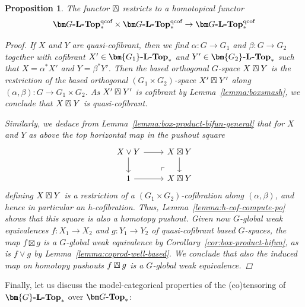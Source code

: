 \documentclass[reqno]{memo-l}
\theoremstyle{mythm}
\newtheorem{prop}[thm]{Proposition}
\theoremstyle{definition}
\numberwithin{equation}{section}
\newcommand{\boxsmash}{\mathbin{\raise.5pt\hbox{\rlap{\lower.5pt\hbox{$\square$}}\kern.55pt$\smashp$\kern.55pt}}}
\newcommand{\cat}[1]{\textbf{\textup{#1}}}
\let\smashp=\wedge
\begin{document}
\begin{prop}\label{prop:boxsmash-qcof}
    The functor $\boxsmash$ restricts to a homotopical functor
    \[
        \cat{$\bm G$-$\cat{L}$-Top}^\textup{qcof}_*
        \times
        \cat{$\bm G$-$\cat{L}$-Top}^\textup{qcof}_*\to
        \cat{$\bm G$-$\cat{L}$-Top}^\textup{qcof}_*
    \]
    \begin{proof}
        If $X$ and $Y$ are quasi-cofibrant, then we find $\alpha\colon G\to G_1$ and $\beta\colon G\to G_2$ together with cofibrant $X'\in\cat{$\bm{G_1}$-\cat{L}-Top}_*$ and $Y'\in\cat{$\bm{G_2}$-\cat{L}-Top}_*$ such that $X=\alpha^*X'$ and $Y=\beta^*Y'$. Then the based orthogonal $G$-space $X\boxsmash Y$ is the restriction of the based orthogonal $(G_1\times G_2)$-space $X'\boxsmash Y'$ along $(\alpha,\beta)\colon G\to G_1\times G_2$. As $X'\boxsmash Y'$ is cofibrant by Lemma~\ref{lemma:boxsmash}, we conclude that $X\boxsmash Y$ is quasi-cofibrant.

        Similarly, we deduce from Lemma~\ref{lemma:box-product-bifun-general} that for $X$ and $Y$ as above the top horizontal map in the pushout square
        \[
            \begin{tikzcd}
                X\vee Y\arrow[d]\arrow[r]\arrow[dr,"\ulcorner"{very near end},phantom] & X\boxtimes Y\arrow[d]\\
                1\arrow[r] & X\boxsmash Y
            \end{tikzcd}
        \]
        defining $X\boxsmash Y$ is a restriction of a $(G_1\times G_2)$-cofibration along $(\alpha,\beta)$, and hence in particular an h-cofibration. Thus, Lemma~\ref{lemma:h-cof-compute-po} shows that this square is also a homotopy pushout. Given now $G$-global weak equivalences $f\colon X_1\to X_2$ and $g\colon Y_1\to Y_2$ of quasi-cofibrant based $G$-spaces, the map $f\boxtimes g$ is a $G$-global weak equivalence by Corollary~\ref{cor:box-product-bifun}, as is $f\vee g$ by Lemma~\ref{lemma:coprod-well-based}. We conclude that also the induced map on homotopy pushouts $f\boxsmash g$ is a $G$-global weak equivalence.
    \end{proof}
\end{prop}

Finally, let us discuss the model-categorical properties of the (co)tensoring of $\cat{$\bm{G}$-$\cat{L}$-Top}_*$ over $\cat{$\bm G$-Top}_*$:
\end{document}
